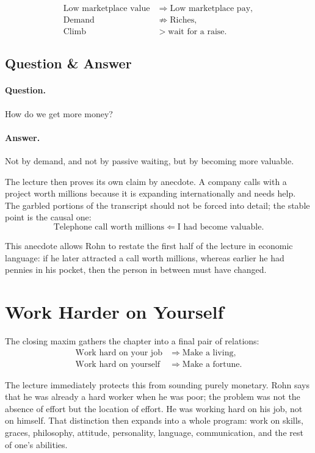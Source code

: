 \begin{align}
\text{Low marketplace value} &\Longrightarrow \text{Low marketplace pay},\\
\text{Demand} &\not\Longrightarrow \text{Riches},\\
\text{Climb} &> \text{wait for a raise}.
\end{align}

\subsection{Question \& Answer}

\paragraph{Question.} How do we get more money?

\paragraph{Answer.} Not by demand, and not by passive waiting, but by becoming more valuable.

The lecture then proves its own claim by anecdote. A company calls with a project worth millions because it is expanding internationally and needs help. The garbled portions of the transcript should not be forced into detail; the stable point is the causal one:
\begin{equation}
\text{Telephone call worth millions} \Longleftarrow \text{I had become valuable}.
\end{equation}

This anecdote allows Rohn to restate the first half of the lecture in economic language: if he later attracted a call worth millions, whereas earlier he had pennies in his pocket, then the person in between must have changed.

\section{Work Harder on Yourself}

The closing maxim gathers the chapter into a final pair of relations:
\begin{align}
\text{Work hard on your job} &\Longrightarrow \text{Make a living},\\
\text{Work hard on yourself} &\Longrightarrow \text{Make a fortune}.
\end{align}

The lecture immediately protects this from sounding purely monetary. Rohn says that he was already a hard worker when he was poor; the problem was not the absence of effort but the location of effort. He was working hard on his job, not on himself. That distinction then expands into a whole program: work on skills, graces, philosophy, attitude, personality, language, communication, and the rest of one's abilities.

